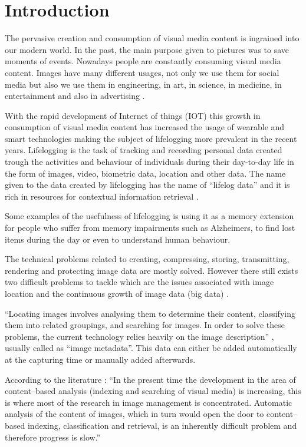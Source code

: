 \cleardoublepage

\chapter{Introduction}
\label{ch:introduction}


The pervasive creation and consumption of visual media content is ingrained into our modern world. In the past, the main purpose given to pictures was to save moments of events. Nowadays people are constantly consuming visual media content. Images have many different usages, not only we use them for social media but also we use them in engineering, in art, in science, in medicine, in entertainment and also in advertising \cite{Zhang2008}.



With the rapid development of Internet of things (IOT) this growth in consumption of visual media content has increased the usage of wearable and smart technologies making the subject of lifelogging more prevalent in the recent years. Lifelogging is the task of tracking and recording personal data created trough the activities and behaviour of individuals during their day-to-day life in the form of images, video, biometric data, location and other data. The name given to the data created by lifelogging has the name of \enquote{lifelog data} and it is rich in resources for contextual information retrieval \cite{Ribeiro}.

Some examples of the usefulness of lifelogging is using it as a memory extension for people who suffer from memory impairments such as Alzheimers, to find lost items during the day or even to understand human behaviour.


The technical problems related to creating, compressing, storing, transmitting, rendering and protecting image data are mostly solved. However there still exists two difficult problems to tackle which are the issues associated with image location and the continuous growth of image data (big data) \cite{Zhang2008}.

``Locating images involves analysing them to determine their content, classifying them into related groupings, and searching for  images. In order to solve these problems, the current technology relies heavily on the image description'' \cite{Zhang2008}, usually called as ``image metadata''. This data can either be added automatically at the capturing time or manually added afterwards.

According to the literature \cite{Zhang2008}: ``In the present time the development in the area of content–based analysis (indexing and searching of visual media) is increasing, this is where most of the research in image management is concentrated. Automatic analysis of the content of images, which in turn would open the door to content–based indexing, classification and retrieval, is an inherently difficult problem and therefore progress is slow.''

